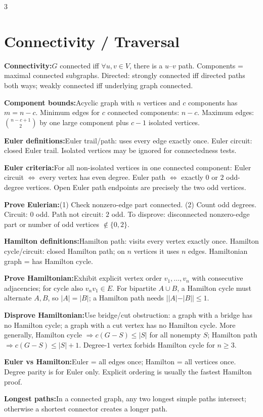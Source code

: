 \documentclass[10pt]{article}
\newenvironment{cheatitems}{\par\vspace{-1pt}}{\par\vspace{-1pt}}
\newcommand{\cheatrow}[2]{\par\noindent\textbf{#1:}\enspace #2\par}
\begin{document}
\begin{multicols}{3}
\section*{Connectivity / Traversal}
\begin{cheatitems}
\cheatrow{Connectivity}{$G$ connected iff $\forall u,v\in V$, there is a $u$--$v$ path. Components = maximal connected subgraphs. Directed: strongly connected iff directed paths both ways; weakly connected iff underlying graph connected.}
\cheatrow{Component bounds}{Acyclic graph with $n$ vertices and $c$ components has $m=n-c$. Minimum edges for $c$ connected components: $n-c$. Maximum edges: $\binom{n-c+1}{2}$ by one large component plus $c-1$ isolated vertices.}
\cheatrow{Euler definitions}{Euler trail/path: uses every edge exactly once. Euler circuit: closed Euler trail. Isolated vertices may be ignored for connectedness tests.}
\cheatrow{Euler criteria}{For all non-isolated vertices in one connected component: Euler circuit $\iff$ every vertex has even degree. Euler path $\iff$ exactly $0$ or $2$ odd-degree vertices. Open Euler path endpoints are precisely the two odd vertices.}
\cheatrow{Prove Eulerian}{(1) Check nonzero-edge part connected. (2) Count odd degrees. Circuit: $0$ odd. Path not circuit: $2$ odd. To disprove: disconnected nonzero-edge part or number of odd vertices $\notin\{0,2\}$.}
\cheatrow{Hamilton definitions}{Hamilton path: visits every vertex exactly once. Hamilton cycle/circuit: closed Hamilton path; on $n$ vertices it uses $n$ edges. Hamiltonian graph = has Hamilton cycle.}
\cheatrow{Prove Hamiltonian}{Exhibit explicit vertex order $v_1,\ldots,v_n$ with consecutive adjacencies; for cycle also $v_nv_1\in E$. For bipartite $A\cup B$, a Hamilton cycle must alternate $A,B$, so $|A|=|B|$; a Hamilton path needs $||A|-|B||\le1$.}
\cheatrow{Disprove Hamiltonian}{Use bridge/cut obstruction: a graph with a bridge has no Hamilton cycle; a graph with a cut vertex has no Hamilton cycle. More generally, Hamilton cycle $\Rightarrow c(G-S)\le |S|$ for all nonempty $S$; Hamilton path $\Rightarrow c(G-S)\le |S|+1$. Degree-$1$ vertex forbids Hamilton cycle for $n\ge3$.}
\cheatrow{Euler vs Hamilton}{Euler = all edges once; Hamilton = all vertices once. Degree parity is for Euler only. Explicit ordering is usually the fastest Hamilton proof.}
\cheatrow{Longest paths}{In a connected graph, any two longest simple paths intersect; otherwise a shortest connector creates a longer path.}
\end{cheatitems}


\end{multicols}
\end{document}

